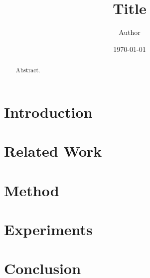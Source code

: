 \documentclass[11pt]{article}
\title{Title}
\author{Author}
\date{\today}
\begin{document}
\maketitle

\begin{abstract}
Abstract.
\end{abstract}

\section{Introduction}

\section{Related Work}

\section{Method}

\section{Experiments}

\section{Conclusion}



\end{document}
